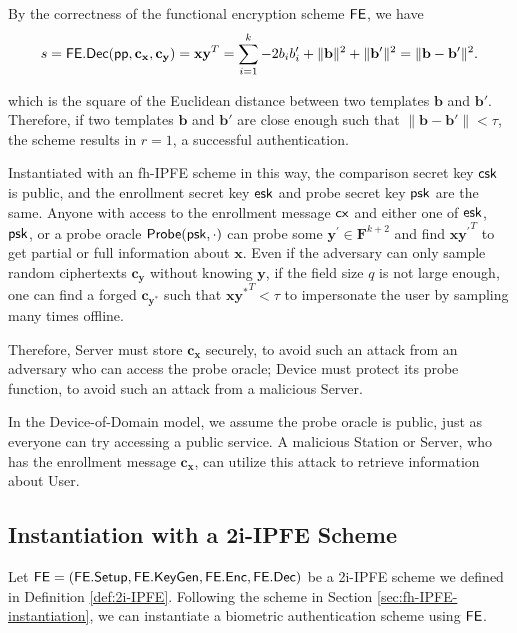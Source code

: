 By the correctness of the functional encryption scheme $\sf FE$, we have
\[
	s = {\sf FE.Dec}({\sf pp}, \mathbf{c_x}, \mathbf{c_y}) =  \mathbf{x} \mathbf{y}^T = \sum_{i=1}^k -2b_ib_i' + \|\mathbf{b}\|^2 + \|\mathbf{b'}\|^2 = \| \mathbf{b} - \mathbf{b'} \|^2.
\]

which is the square of the Euclidean distance between two templates $\mathbf{b}$ and $\mathbf{b}'$. Therefore, if two templates $\mathbf{b}$ and $\mathbf{b}'$ are close enough such that $\|\mathbf{b} - \mathbf{b'}\| < \tau$, the scheme results in $r = 1$, a successful authentication.


Instantiated with an fh-IPFE scheme in this way, the comparison secret key ${\sf csk}$ is public, and the enrollment secret key ${\sf esk}$ and probe secret key ${\sf psk}$ are the same. Anyone with access to the enrollment message ${\sf cx}$ and either one of ${\sf esk}$, ${\sf psk}$, or a probe oracle ${\sf Probe}({\sf psk}, \cdot )$ can probe some $\mathbf{y}^{\prime} \in \mathbf{F}^{k+2}$ and find $\mathbf{x} {\mathbf{y}^\prime}^T$ to get partial or full information about $\mathbf{x}$. Even if the adversary can only sample random ciphertexts $\mathbf{c_{y}}$ without knowing $\mathbf{y}$, if the field size $q$ is not large enough, one can find a forged $\mathbf{c_{y^*}}$ such that $\mathbf{x}\mathbf{y^*}^T < \tau$ to impersonate the user by sampling many times offline.

Therefore, {\sf Server} must store $\mathbf{c_x}$ securely, to avoid such an attack from an adversary who can access the probe oracle; {\sf Device} must protect its probe function, to avoid such an attack from a malicious {\sf Server}. 

In the Device-of-Domain model, we assume the probe oracle is public, just as everyone can try accessing a public service. A malicious {\sf Station} or {\sf Server}, who has the enrollment message $\mathbf{c_x}$, can utilize this attack to retrieve information about {\sf User}.




\subsection{Instantiation with a 2i-IPFE Scheme}
\label{sec:2i-IPFE-instantiation}

Let ${\sf FE} = ({\sf FE.Setup}, {\sf FE.KeyGen}, {\sf FE.Enc}, {\sf FE.Dec})$ be a 2i-IPFE scheme we defined in Definition \ref{def:2i-IPFE}. Following the scheme in Section \ref{sec:fh-IPFE-instantiation}, we can instantiate a biometric authentication scheme using ${\sf FE}$.

